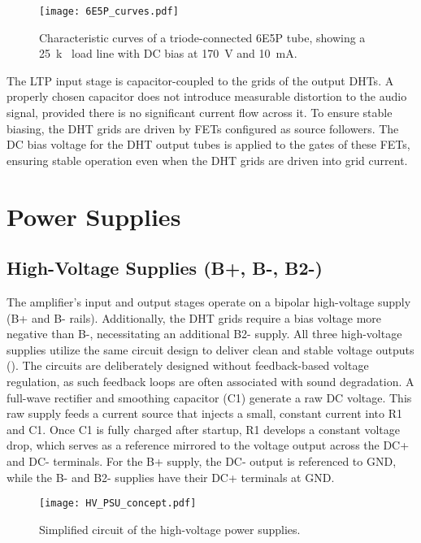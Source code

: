 \begin{figure}
\begin{center}
\texttt{[image: 6E5P\_curves.pdf]}
\caption{Characteristic curves of a triode-connected 6E5P tube, showing a \SI{25}{k\Ohm} load line with DC bias at \SI{170}{V} and \SI{10}{mA}.}
\end{center}
\end{figure}

The LTP input stage is capacitor-coupled to the grids of the output DHTs. A properly chosen capacitor does not introduce measurable distortion to the audio signal\cite{bateman_caps_distortion}, provided there is no significant current flow across it\cite{aiken_farting_out}. To ensure stable biasing, the DHT grids are driven by FETs configured as source followers. The DC bias voltage for the DHT output tubes is applied to the gates of these FETs, ensuring stable operation even when the DHT grids are driven into grid current.


\section{Power Supplies}

\subsection{High-Voltage Supplies (B+, B-, B2-)}
The amplifier's input and output stages operate on a bipolar high-voltage supply (B+ and B- rails). Additionally, the DHT grids require a bias voltage more negative than B-, necessitating an additional B2- supply. All three high-voltage supplies utilize the same circuit design to deliver clean and stable voltage outputs (). The circuits are deliberately designed without feedback-based voltage regulation, as such feedback loops are often associated with sound degradation. A full-wave rectifier and smoothing capacitor (C1) generate a raw DC voltage. This raw supply feeds a current source that injects a small, constant current into R1 and C1. Once C1 is fully charged after startup, R1 develops a constant voltage drop, which serves as a reference mirrored to the voltage output across the DC+ and DC- terminals. For the B+ supply, the DC- output is referenced to GND, while the B- and B2- supplies have their DC+ terminals at GND.

\begin{figure}
\begin{center}
\texttt{[image: HV\_PSU\_concept.pdf]}
\caption{Simplified circuit of the high-voltage power supplies.}
\end{center}
\end{figure}

